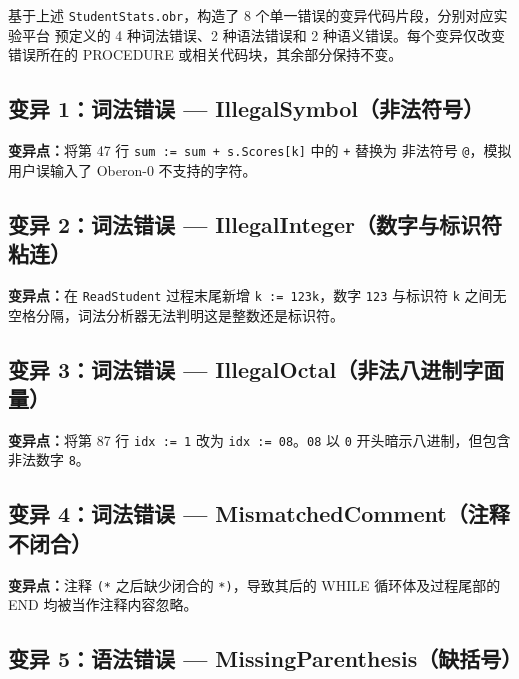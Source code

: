 \documentclass[a4paper]{article}
\begin{document}
基于上述 \texttt{StudentStats.obr}，构造了 8 个单一错误的变异代码片段，分别对应实验平台
预定义的 4 种词法错误、2 种语法错误和 2 种语义错误。每个变异仅改变错误所在的
PROCEDURE 或相关代码块，其余部分保持不变。

\subsection{变异 1：词法错误 — IllegalSymbol（非法符号）}



\textbf{变异点：}将第 47 行 \texttt{sum := sum + s.Scores[k]} 中的 \texttt{+} 替换为
非法符号 \texttt{@}，模拟用户误输入了 Oberon-0 不支持的字符。

\subsection{变异 2：词法错误 — IllegalInteger（数字与标识符粘连）}



\textbf{变异点：}在 \texttt{ReadStudent} 过程末尾新增 \texttt{k := 123k}，数字
\texttt{123} 与标识符 \texttt{k} 之间无空格分隔，词法分析器无法判明这是整数还是标识符。

\subsection{变异 3：词法错误 — IllegalOctal（非法八进制字面量）}



\textbf{变异点：}将第 87 行 \texttt{idx := 1} 改为 \texttt{idx := 08}。\texttt{08}
以 \texttt{0} 开头暗示八进制，但包含非法数字 \texttt{8}。

\subsection{变异 4：词法错误 — MismatchedComment（注释不闭合）}



\textbf{变异点：}注释 \texttt{(*} 之后缺少闭合的 \texttt{*)}，导致其后的
WHILE 循环体及过程尾部的 END 均被当作注释内容忽略。

\subsection{变异 5：语法错误 — MissingParenthesis（缺括号）}
\end{document}
